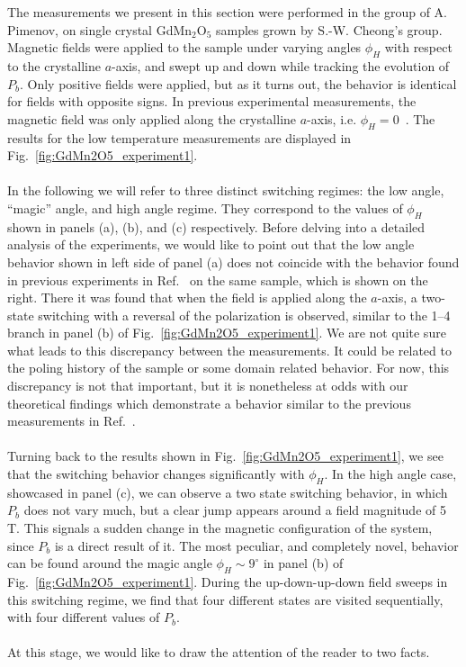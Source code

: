 The measurements we present in this section were performed in the group of A. Pimenov, on single crystal GdMn$_2$O$_5$ samples grown by S.-W. Cheong's group.
Magnetic fields were applied to the sample under varying angles $\phi_H$ with respect to the crystalline $a$-axis, and swept up and down while tracking the evolution of $P_b$.
Only positive fields were applied, but as it turns out, the behavior is identical for fields with opposite signs. 
In previous experimental measurements, the magnetic field was only applied along the crystalline $a$-axis, i.e. $\phi_H = 0$~\cite{Lee13}.
The results for the low temperature measurements are displayed in Fig.~\ref{fig:GdMn2O5_experiment1}.
\\\\
In the following we will refer to three distinct switching regimes: the low angle, ``magic'' angle, and high angle regime.
They correspond to the values of $\phi_H$ shown in panels (a), (b), and (c) respectively.
Before delving into a detailed analysis of the experiments, we would like to point out that the low angle behavior shown in left side of panel (a) does not coincide with the behavior found in previous experiments in Ref.~\cite{Lee13} on the same sample, which is shown on the right.
There it was found that when the field is applied along the $a$-axis, a two-state switching with a reversal of the polarization is observed, similar to the 1--4 branch in panel (b) of Fig.~\ref{fig:GdMn2O5_experiment1}.
We are not quite sure what leads to this discrepancy between the measurements. It could be related to the poling history of the sample or some domain related behavior.
For now, this discrepancy is not that important, but it is nonetheless at odds with our theoretical findings which demonstrate a behavior similar to the previous measurements in Ref.~\cite{Lee13}. 
\\\\
Turning back to the results shown in Fig.~\ref{fig:GdMn2O5_experiment1}, we see that the switching behavior changes significantly with $\phi_H$.
In the high angle case, showcased in panel (c), we can observe a two state switching behavior, in which $P_b$ does not vary much, but a clear jump appears around a field magnitude of 5 T.
This signals a sudden change in the magnetic configuration of the system, since $P_b$ is a direct result of it.
The most peculiar, and completely novel, behavior can be found around the magic angle $\phi_H \sim 9^\circ$ in panel (b) of Fig.~\ref{fig:GdMn2O5_experiment1}.
During the up-down-up-down field sweeps in this switching regime, we find that four different states are visited sequentially, with four different values of $P_b$.
\\\\
At this stage, we would like to draw the attention of the reader to two facts.

